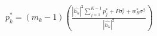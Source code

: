 \documentclass[preview]{standalone}
\begin{document}
\begin{align*}
p_k^\ast = \left(m_k-1\right) \left(\frac{\left|\hat{h_k}\right|^2 \sum_{j=1}^{K-1} {p_j^\ast} + P \sigma_{\epsilon}^2 + w_B^\ast \sigma^2}{\left|\hat{h_k}\right|^2}\right)
\end{align*}
\end{document}
